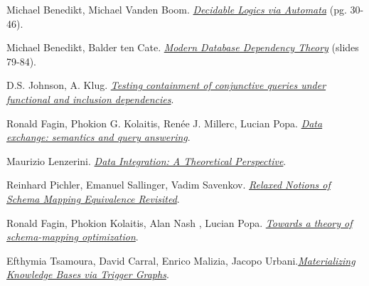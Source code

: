 \documentclass[11pt, a4paper, dvipsnames]{article}
\begin{document}
\begin{thebibliography}{9}

Michael Benedikt, Michael Vanden Boom. \emph{\href{http://www.cs.ox.ac.uk/michael.benedikt/readingcourse/coursenotes2020.pdf}{Decidable Logics via Automata}} (pg. 30-46).

Michael Benedikt, Balder ten Cate. \emph{\href{https://cpb-us-e1.wpmucdn.com/sites.ucsc.edu/dist/4/1230/files/2014/09/esslli-all.compressed.pdf} {Modern Database
Dependency Theory}} (slides 79-84).

D.S. Johnson, A. Klug. \emph{\href{https://cs.uwaterloo.ca/~david/kbdb/johnstonandklug.pdf}{Testing containment of conjunctive queries under functional and inclusion dependencies}}.

Ronald Fagin, Phokion G. Kolaitis, Renée J. Millerc,
Lucian Popa. \emph{\href{http://dblab.cs.toronto.edu/project/dataexchange/docs/tcs05.pdf}{Data exchange: semantics and query answering}}.

Maurizio Lenzerini. \emph{\href{https://tanca.faculty.polimi.it/wp-content/uploads/images/documents/TIS/lezioni/1_3_integration-lenzerini.pdf}{Data Integration: A Theoretical Perspective}}.

Reinhard Pichler, Emanuel Sallinger, Vadim Savenkov. \emph{\href{http://www.dit.unitn.it/~p2p/RelatedWork/Matching/a10-pichler.pdf}{Relaxed Notions of Schema Mapping Equivalence Revisited}}.

Ronald Fagin, Phokion Kolaitis, Alan Nash
, Lucian Popa. \emph{\href{https://www.researchgate.net/publication/221559365_Towards_a_theory_of_schema-mapping_optimization}{Towards a theory of schema-mapping optimization}}.

Efthymia Tsamoura, David Carral, Enrico Malizia, Jacopo Urbani.\emph{\href{http://www.vldb.org/pvldb/vol14/p943-tsamoura.pdf}{Materializing Knowledge Bases via Trigger Graphs}}.

\end{thebibliography}
\end{document}
